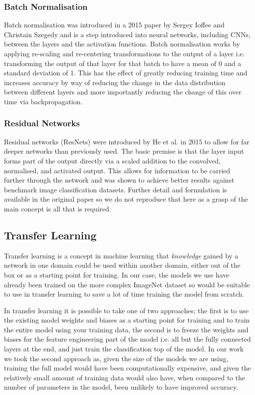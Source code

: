 \documentclass[12pt]{article}
\numberwithin{equation}{section}
\numberwithin{figure}{section}
\begin{document}
\subsubsection{Batch Normalisation}
Batch normalisation was introduced in a 2015 paper by Sergey Ioffee and Christain Szegedy\cite{Ioffe2015} and is a step introduced into neural networks, including CNNs, between the layers and the activation functions. Batch normalisation works by applying re-scaling and re-centering transformations to the output of a layer i.e. transforming the output of that layer for that batch to have a mean of 0 and a standard deviation of 1. This has the effect of greatly reducing training time and increases accuracy by way of reducing the change in the data distribution between different layers and more importantly reducing the change of this over time via backpropagation. 

\subsubsection{Residual Networks}
Residual networks (ResNets) were introduced by He et al. in 2015\cite{He2015a} to allow for far deeper networks than previously used. The basic premise is that the layer input forms part of the output directly via a scaled addition to the convolved, normalised, and activated output. This allows for information to be carried further through the network and was shown to achieve better results against benchmark image classification datasets. Further detail and formulation is available in the original paper so we do not reproduce that here as a grasp of the main concept is all that is required.

\subsection{Transfer Learning} 
\label{sub:Transfer_Learning} 
Transfer learning is a concept in machine learning that \emph{knowledge} gained by a network in one domain could be used within another domain, either out of the box or as a starting point for training. In our case, the models we use have already been trained on the more complex ImageNet dataset so would be suitable to use in transfer learning to save a lot of time training the model from scratch.


In transfer learning it is possible to take one of two approaches; the first is to use the existing model weights and biases as a starting point for training and to train the entire model using your training data, the second is to freeze the weights and biases for the feature engineering part of the model i.e. all but the fully connected layers at the end, and just train the classification top of the model. In our work we took the second approach as, given the size of the models we are using, training the full model would have been computationally expensive, and given the relatively small amount of training data would also have, when compared to the number of parameters in the model, been unlikely to have improved accuracy.
\end{document}
